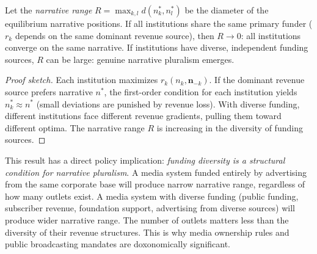 \begin{proposition}
\label{prop:narrative-range}
Let the \emph{narrative range} $R = \max_{k,l} d(n_k^*, n_l^*)$ be the diameter of the equilibrium narrative positions.
If all institutions share the same primary funder ($r_k$ depends on the same dominant revenue source), then $R \to 0$: all institutions converge on the same narrative.
If institutions have diverse, independent funding sources, $R$ can be large: genuine narrative pluralism emerges.
\end{proposition}

\begin{proof}[Proof sketch]
Each institution maximizes $r_k(n_k, \bm{n}_{-k})$.
If the dominant revenue source prefers narrative $n^*$, the first-order condition for each institution yields $n_k^* \approx n^*$ (small deviations are punished by revenue loss).
With diverse funding, different institutions face different revenue gradients, pulling them toward different optima.
The narrative range $R$ is increasing in the diversity of funding sources.
\end{proof}

\begin{remark}
\label{rem:policy-implication}
This result has a direct policy implication: \emph{funding diversity is a structural condition for narrative pluralism}.
A media system funded entirely by advertising from the same corporate base will produce narrow narrative range, regardless of how many outlets exist.
A media system with diverse funding (public funding, subscriber revenue, foundation support, advertising from diverse sources) will produce wider narrative range.
The number of outlets matters less than the diversity of their revenue structures.
This is why media ownership rules and public broadcasting mandates are doxonomically significant.
\end{remark}

